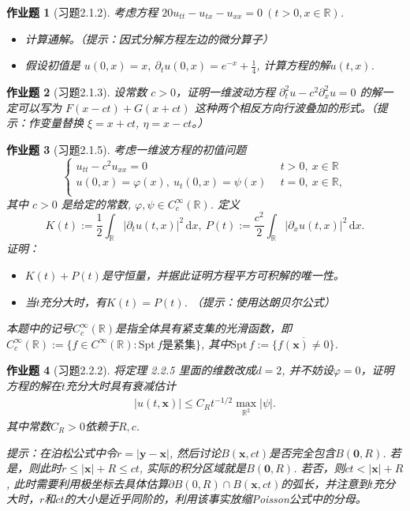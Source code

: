 \documentclass[UTF8,fontset=windows,12pt]{ctexart}
\theoremstyle{kaiti-theorem}
\newtheorem{problem}{作业题}
\numberwithin{equation}{section}
\newcommand{\R}{\mathbb{R}}
\newcommand{\bd}[1]{\mathbf{#1}}  %
\newcommand{\bds}[1]{\boldsymbol{#1}}  %
\newcommand{\vp}{\varphi}
\newcommand{\p}{\partial}
\newcommand{\dx}{\,\mathrm{d}x}
\newcommand{\spt}{\text{Spt}\,}
\newcommand{\xx}{{\bds{x}}}
\newcommand{\yy}{{\bds{y}}}
\begin{document}
\begin{problem}[习题2.1.2] 
考虑方程 $20u_{tt}-u_{tx}-u_{xx}=0~(t>0,x\in\R)$.
\begin{itemize}
\item  [(1)] 计算通解。（提示：因式分解方程左边的微分算子）
\item  [(2)] 假设初值是 $u(0,x)=x,~\p_t u(0,x)=e^{-x}+\frac14$, 计算方程的解$u(t,x)$.
\end{itemize}
\end{problem}


\begin{problem}[习题2.1.3]
设常数 $c>0$，证明一维波动方程 $\p_t^2 u -c^2 \p_x^2 u = 0$ 的解一定可以写为 $F(x-ct)+G(x+ct)$ 这种两个相反方向行波叠加的形式。（提示：作变量替换 $\xi=x+ct$, $\eta=x-ct$。）
\end{problem}


\begin{problem}[习题2.1.5]
考虑一维波方程的初值问题
\begin{equation*}
\begin{cases}
u_{tt}-c^2u_{xx}=0&~~t>0,~x\in\R\\
u(0,x)=\varphi(x),~u_t(0,x)=\psi(x)&~~t=0,~x\in\R,\\
\end{cases}
\end{equation*}其中 $c>0$ 是给定的常数, $\varphi,\psi\in C_c^{\infty}(\R)$. 定义$$K(t):=\frac12\int_\R |\p_t u(t,x)|^2\dx,~P(t):=\frac{c^2}{2}\int_\R|\p_x u (t,x)|^2\dx.$$ 证明：
\begin{itemize}
\item [(1)]  $K(t)+P(t)$是守恒量，并据此证明方程平方可积解的唯一性。
\item [(2)]  当$t$充分大时，有$K(t)=P(t)$. （提示：使用达朗贝尔公式）
\end{itemize}
本题中的记号$C_c^\infty(\R)$是指全体具有紧支集的光滑函数，即$C_c^\infty(\R):=\{f\in C^\infty(\R):\spt f\text{是紧集}\}$, 其中$\spt f:=\overline{\{f(\xx)\neq 0\}}$.
\end{problem}

\begin{problem}[习题2.2.2] 
将定理 2.2.5 里面的维数改成$d=2$, 并不妨设$\vp=0$，证明方程的解在$t$充分大时具有衰减估计
\begin{align}
|u(t,\xx)|\leqslant C_Rt^{-1/2}\max_{\R^2}|\psi|.
\end{align}其中常数$C_R>0$依赖于$R,c$.

提示：在泊松公式中令$r=|\yy-\xx|$, 然后讨论$B(\xx,ct)$是否完全包含$B(\bd{0},R)$. 若是，则此时$r\leqslant |\xx|+R\leqslant ct$, 实际的积分区域就是$B(\bd{0},R)$. 若否，则$ct<|\xx|+R$, 此时需要利用极坐标去具体估算$\p B(0,R)\cap B(\xx,ct)$的弧长，并注意到$t$充分大时，$r$和$ct$的大小是近乎同阶的，利用该事实放缩Poisson公式中的分母。
\end{problem}
\end{document}
